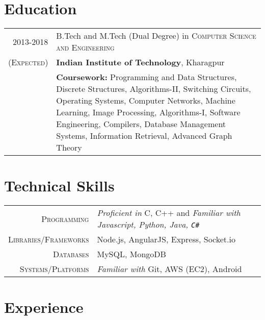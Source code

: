 \documentclass[a4paper,10pt]{extarticle} %
\begin{document}
\section{Education}

\begin{tabular}{r|p{17cm}}	
2013-2018 & B.Tech and M.Tech (Dual Degree) in \textsc{Computer Science and Engineering}\\
\textsc{(Expected)}&\textbf{Indian Institute of Technology}, Kharagpur\\
&\textbf{Coursework: }{Programming and Data Structures, Discrete Structures, Algorithms-II, Switching Circuits, Operating Systems, Computer Networks, Machine Learning, Image Processing, Algorithms-I, Software Engineering, Compilers, Database Management Systems, Information Retrieval, Advanced Graph Theory}
\end{tabular}



\section{Technical Skills}

\begin{tabular}{r|p{17cm}}
	\textsc{Programming} & {\itshape{Proficient in}} C, C++ and \itshape{Familiar with} Javascript, Python, Java, \verb!C#! \\
	\textsc{Libraries/Frameworks} & Node.js, AngularJS, Express, Socket.io\\
	\textsc{Databases} & MySQL, MongoDB\\
	\textsc{Systems/Platforms} & {\itshape{Familiar with }}Git, AWS (EC2), Android
\end{tabular}


\section{Experience}
\end{document}
